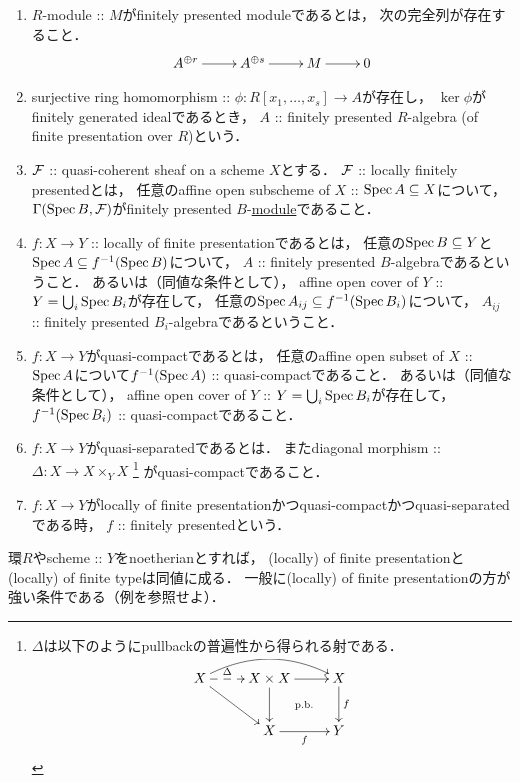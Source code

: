 \documentclass[a4paper, dvipdfmx]{jsarticle}
\begin{document}
\begin{Def}
    \begin{enumerate}[label=(\roman*), leftmargin=*] \hfill \vspace{-0.5cm}
    \item
        $R$-module :: $M$がfinitely presented moduleであるとは，
        次の完全列が存在すること．
        \[\xymatrix{
            A^{\oplus r} \ar[r]& A^{\oplus s} \ar[r]& M \ar[r]& 0
        }\]

    \item
        surjective ring homomorphism :: $\phi \colon R[x_1, \dots, x_s] \to A$が存在し，
        $\ker \phi$がfinitely generated idealであるとき，
        $A$ :: finitely presented $R$-algebra (of finite presentation over $R$)という．

    \item
        $\mathcal{F}$ :: quasi-coherent sheaf on a scheme $X$とする．
        $\mathcal{F}$ :: locally finitely presentedとは，
        任意のaffine open subscheme of $X$ :: $\operatorname{Spec} A \subseteq X$について，
        $\Gamma(\operatorname{Spec} B, \mathcal{F})$がfinitely presented $B$-\underline{module}であること．

    \item
        $f \colon X \to Y$ :: locally of finite presentationであるとは，
        任意の$\operatorname{Spec} B \subseteq Y$と$\operatorname{Spec} A \subseteq f^{-1}(\operatorname{Spec} B)$について，
        $A$ :: finitely presented $B$-algebraであるということ．
        あるいは（同値な条件として），
        affine open cover of $Y$ :: $Y=\bigcup_i \operatorname{Spec} B_i$が存在して，
        任意の$\operatorname{Spec} A_{ij} \subseteq f^{-1}(\operatorname{Spec} B_i)$について，
        $A_{ij}$ :: finitely presented $B_{i}$-algebraであるということ．

    \item
        $f \colon X \to Y$がquasi-compactであるとは，
        任意のaffine open subset of $X$ :: $\operatorname{Spec} A$について$f^{-1}(\operatorname{Spec} A)$ :: quasi-compactであること．
        あるいは（同値な条件として），
        affine open cover of $Y$ :: $Y=\bigcup_i \operatorname{Spec} B_i$が存在して，
        $f^{-1}(\operatorname{Spec} B_i)$ :: quasi-compactであること．
        
    \item
        $f \colon X \to Y$がquasi-separatedであるとは．
        またdiagonal morphism :: $\Delta \colon X \to X \times_{Y} X$
        \footnote
        {
            $\Delta$は以下のようにpullbackの普遍性から得られる射である．
            \[\xymatrix{
                    X \ar@/^5mm/[rr]\ar[rd]\ar@{-->}[r]^-{\Delta}& X \times X \ar[d]\ar[r] & X\ar[d]^-{f} \\
                {}& X\ar[r]_-{f} & Y \ar@{}[lu]|{\text{p.b.}}
            }\]
        }
        がquasi-compactであること．

    \item
        $f \colon X \to Y$がlocally of finite presentationかつquasi-compactかつquasi-separatedである時，
        $f$ :: finitely presentedという．
\end{enumerate}
\end{Def}
環$R$やscheme :: $Y$をnoetherianとすれば，
(locally) of finite presentationと(locally) of finite typeは同値に成る．
一般に(locally) of finite presentationの方が強い条件である（例を参照せよ）．
\end{document}
